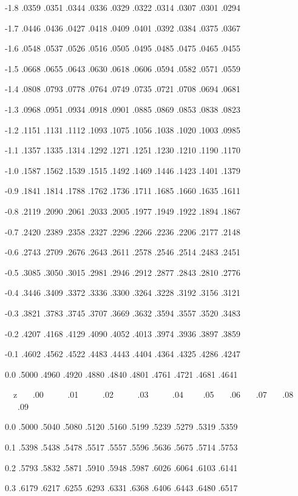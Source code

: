 \documentclass[12pt,fleqn]{article}\usepackage{../../common}
\begin{document}
-1.8 .0359 .0351 .0344 .0336 .0329 .0322 .0314 .0307 .0301 .0294

-1.7 .0446 .0436 .0427 .0418 .0409 .0401 .0392 .0384 .0375 .0367

-1.6 .0548 .0537 .0526 .0516 .0505 .0495 .0485 .0475 .0465 .0455

-1.5 .0668 .0655 .0643 .0630 .0618 .0606 .0594 .0582 .0571 .0559

-1.4 .0808 .0793 .0778 .0764 .0749 .0735 .0721 .0708 .0694 .0681

-1.3 .0968 .0951 .0934 .0918 .0901 .0885 .0869 .0853 .0838 .0823

-1.2 .1151 .1131 .1112 .1093 .1075 .1056 .1038 .1020 .1003 .0985

-1.1 .1357 .1335 .1314 .1292 .1271 .1251 .1230 .1210 .1190 .1170

-1.0 .1587 .1562 .1539 .1515 .1492 .1469 .1446 .1423 .1401 .1379

-0.9 .1841 .1814 .1788 .1762 .1736 .1711 .1685 .1660 .1635 .1611

-0.8 .2119 .2090 .2061 .2033 .2005 .1977 .1949 .1922 .1894 .1867

-0.7 .2420 .2389 .2358 .2327 .2296 .2266 .2236 .2206 .2177 .2148

-0.6 .2743 .2709 .2676 .2643 .2611 .2578 .2546 .2514 .2483 .2451

-0.5 .3085 .3050 .3015 .2981 .2946 .2912 .2877 .2843 .2810 .2776

-0.4 .3446 .3409 .3372 .3336 .3300 .3264 .3228 .3192 .3156 .3121

-0.3 .3821 .3783 .3745 .3707 .3669 .3632 .3594 .3557 .3520 .3483

-0.2 .4207 .4168 .4129 .4090 .4052 .4013 .3974 .3936 .3897 .3859

-0.1 .4602 .4562 .4522 .4483 .4443 .4404 .4364 .4325 .4286 .4247

0.0 .5000 .4960 .4920 .4880 .4840 .4801 .4761 .4721 .4681 .4641

\newpage

\ \ z \ \ \  .00  \ \ \ \ \ .01 \ \ \ \ \ .02 \ \ \ \ \ .03 \ \ \ \ \ .04 \
\ \ \ .05 \ \ \ .06 \
\ \ .07 \ \ \ .08 \ \ \ .09

0.0 .5000 .5040 .5080 .5120 .5160 .5199 .5239 .5279 .5319 .5359

0.1 .5398 .5438 .5478 .5517 .5557 .5596 .5636 .5675 .5714 .5753

0.2 .5793 .5832 .5871 .5910 .5948 .5987 .6026 .6064 .6103 .6141

0.3 .6179 .6217 .6255 .6293 .6331 .6368 .6406 .6443 .6480 .6517
\end{document}
